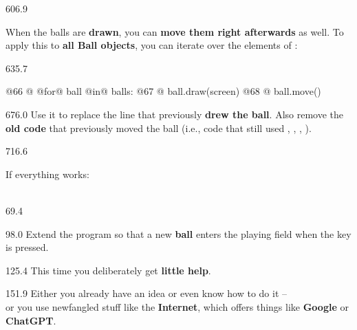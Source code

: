 \documentclass{aslab}
\newcommand*\codexi[1]{\fontsize{11bp}{#1bp}\ttfamily\lineskiplimit=-\maxdimen}
\begin{document}
\begin{region}[pitch=15.2]{606.9}
\begin{dashlist}
\item When the balls are \textbf{drawn}, you can \textbf{move them right
  afterwards} as well. To apply this to \textbf{all Ball objects}, you can
  iterate over the elements of :
\end{dashlist}
\end{region}

\begin{region}[x=68.7,right=0,pitch=13.2]{635.7}
\begin{codeblock}[style=py,basicstyle=\codexi{13.2}]
@66 @    @for@ ball @in@ balls:
@67 @        ball.draw(screen)
@68 @        ball.move()
\end{codeblock}
\end{region}

\begin{region}[x=68.7,right=0,pitch=13.9]{676.0}
Use it to replace the line that previously \textbf{drew the ball}. Also
remove the \textbf{old code} that previously moved the ball (i.e., code that
still used , , , ).
\end{region}

\begin{region}[pitch=13.6]{716.6}
\begin{dashlist}
\item If everything works:\\
  \\
\end{dashlist}
\end{region}

\nextpage
\begin{region}{69.4}
\end{region}

\begin{region}{98.0}
Extend the program so that a new \textbf{ball} enters the playing field when
the key  is pressed.
\end{region}

\begin{region}{125.4}
This time you deliberately get \textbf{little help}.
\end{region}

\begin{region}[pitch=13.75]{151.9}
Either you already have an idea or even know how to do it --\\
or you use newfangled stuff like the \textbf{Internet}, which offers things
like \textbf{Google} or \textbf{ChatGPT}.
\end{region}
\end{document}
